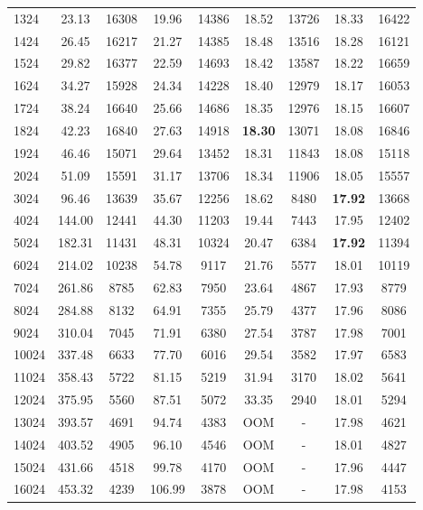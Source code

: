 \begin{table}[]
\begin{center}
\begin{tabular}{@{}lcccccccc@{}}
1324   & 23.13      & 16308 & 19.96  & 14386 & 18.52   & 13726 & 18.33 & 16422 \\
1424   & 26.45      & 16217 & 21.27  & 14385 & 18.48   & 13516 & 18.28 & 16121 \\
1524   & 29.82      & 16377 & 22.59  & 14693 & 18.42   & 13587 & 18.22 & 16659 \\
1624   & 34.27      & 15928 & 24.34  & 14228 & 18.40   & 12979 & 18.17 & 16053 \\
1724   & 38.24      & 16640 & 25.66  & 14686 & 18.35   & 12976 & 18.15 & 16607 \\
1824   & 42.23      & 16840 & 27.63  & 14918 & \textbf{18.30}   & 13071 & 18.08 & 16846 \\
1924   & 46.46      & 15071 & 29.64  & 13452 & 18.31   & 11843 & 18.08 & 15118 \\
2024   & 51.09      & 15591 & 31.17  & 13706 & 18.34   & 11906 & 18.05 & 15557 \\
3024   & 96.46      & 13639 & 35.67  & 12256 & 18.62   & 8480  & \textbf{17.92} & 13668 \\
4024   & 144.00     & 12441 & 44.30  & 11203 & 19.44   & 7443  & 17.95 & 12402 \\
5024   & 182.31     & 11431 & 48.31  & 10324 & 20.47   & 6384  &\textbf{ 17.92} & 11394 \\
6024   & 214.02     & 10238 & 54.78  & 9117  & 21.76   & 5577  & 18.01 & 10119 \\
7024   & 261.86     & 8785  & 62.83  & 7950  & 23.64   & 4867  & 17.93 & 8779  \\
8024   & 284.88     & 8132  & 64.91  & 7355  & 25.79   & 4377  & 17.96 & 8086  \\
9024   & 310.04     & 7045  & 71.91  & 6380  & 27.54   & 3787  & 17.98 & 7001  \\
10024  & 337.48     & 6633  & 77.70  & 6016  & 29.54   & 3582  & 17.97 & 6583  \\
11024  & 358.43     & 5722  & 81.15  & 5219  & 31.94   & 3170  & 18.02 & 5641  \\
12024  & 375.95     & 5560  & 87.51  & 5072  & 33.35   & 2940  & 18.01 & 5294  \\
13024  & 393.57     & 4691  & 94.74  & 4383  & OOM     & -      & 17.98 & 4621  \\
14024  & 403.52     & 4905  & 96.10  & 4546  & OOM     &  -     & 18.01 & 4827  \\
15024  & 431.66     & 4518  & 99.78  & 4170  & OOM     &   -    & 17.96 & 4447  \\
16024  & 453.32     & 4239  & 106.99 & 3878  & OOM     &   -    & 17.98 & 4153  \\ 
 \bottomrule
\end{tabular}
\end{center}
\end{table}

